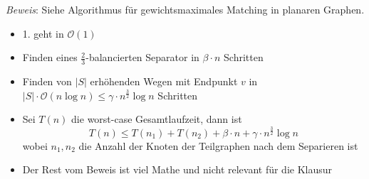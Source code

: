 \textit{Beweis}: Siehe Algorithmus für gewichtsmaximales Matching in planaren Graphen.
\begin{itemize}
	\item 1. geht in $\mathcal{O}(1)$
	\item Finden eines $\frac{2}{3}$-balancierten Separator in $\beta \cdot n$ Schritten
	\item Finden von $|S|$ erhöhenden Wegen mit Endpunkt $v$ in $|S|\cdot\mathcal{O}(n\log n)\leq \gamma\cdot n^{\frac{3}{2}}\log n$ Schritten
	\item Sei $T(n)$ die worst-case Gesamtlaufzeit, dann ist $$T(n)\leq T(n_1)+T(n_2)+\beta\cdot n+\gamma\cdot n^{\frac{3}{2}}\log n$$ wobei $n_1,n_2$ die Anzahl der Knoten der Teilgraphen nach dem Separieren ist
	\item Der Rest vom Beweis ist viel Mathe und nicht relevant für die Klausur
\end{itemize}